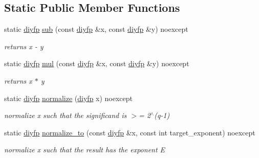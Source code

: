 \subsection*{Static Public Member Functions}
\begin{DoxyCompactItemize}
\item 
static \mbox{\hyperlink{structnlohmann_1_1detail_1_1dtoa__impl_1_1diyfp}{diyfp}} \mbox{\hyperlink{structnlohmann_1_1detail_1_1dtoa__impl_1_1diyfp_aeb26771af54ad73598c1a0430d65d884}{sub}} (const \mbox{\hyperlink{structnlohmann_1_1detail_1_1dtoa__impl_1_1diyfp}{diyfp}} \&x, const \mbox{\hyperlink{structnlohmann_1_1detail_1_1dtoa__impl_1_1diyfp}{diyfp}} \&y) noexcept
\begin{DoxyCompactList}\small\item\em returns x -\/ y \end{DoxyCompactList}\item 
static \mbox{\hyperlink{structnlohmann_1_1detail_1_1dtoa__impl_1_1diyfp}{diyfp}} \mbox{\hyperlink{structnlohmann_1_1detail_1_1dtoa__impl_1_1diyfp_aa5f250d12ce89c81fdb08900c6a823e8}{mul}} (const \mbox{\hyperlink{structnlohmann_1_1detail_1_1dtoa__impl_1_1diyfp}{diyfp}} \&x, const \mbox{\hyperlink{structnlohmann_1_1detail_1_1dtoa__impl_1_1diyfp}{diyfp}} \&y) noexcept
\begin{DoxyCompactList}\small\item\em returns x $\ast$ y \end{DoxyCompactList}\item 
static \mbox{\hyperlink{structnlohmann_1_1detail_1_1dtoa__impl_1_1diyfp}{diyfp}} \mbox{\hyperlink{structnlohmann_1_1detail_1_1dtoa__impl_1_1diyfp_a2246b5b40c7c6992153ef174063d6aa6}{normalize}} (\mbox{\hyperlink{structnlohmann_1_1detail_1_1dtoa__impl_1_1diyfp}{diyfp}} x) noexcept
\begin{DoxyCompactList}\small\item\em normalize x such that the significand is $>$= 2$^\wedge$(q-\/1) \end{DoxyCompactList}\item 
static \mbox{\hyperlink{structnlohmann_1_1detail_1_1dtoa__impl_1_1diyfp}{diyfp}} \mbox{\hyperlink{structnlohmann_1_1detail_1_1dtoa__impl_1_1diyfp_a6b6665e467ebabe0c0f7418d3fe4b118}{normalize\+\_\+to}} (const \mbox{\hyperlink{structnlohmann_1_1detail_1_1dtoa__impl_1_1diyfp}{diyfp}} \&x, const int target\+\_\+exponent) noexcept
\begin{DoxyCompactList}\small\item\em normalize x such that the result has the exponent E \end{DoxyCompactList}\end{DoxyCompactItemize}
